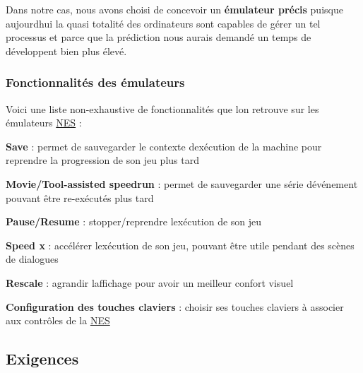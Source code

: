 Dans notre cas, nous avons choisi de concevoir un {\bfseries émulateur précis} puisque aujourd\textquotesingle{}hui la quasi totalité des ordinateurs sont capables de gérer un tel processus et parce que la prédiction nous aurais demandé un temps de développent bien plus élevé.

\subsubsection*{Fonctionnalités des émulateurs}

Voici une liste non-\/exhaustive de fonctionnalités que l\textquotesingle{}on retrouve sur les émulateurs \hyperlink{struct_n_e_s}{N\+ES} \+:


\begin{DoxyItemize}
\item {\bfseries Save} \+: permet de sauvegarder le contexte d\textquotesingle{}exécution de la machine pour reprendre la progression de son jeu plus tard
\item {\bfseries Movie/\+Tool-\/assisted speedrun} \+: permet de sauvegarder une série d\textquotesingle{}événement pouvant être re-\/exécutés plus tard
\item {\bfseries Pause/\+Resume} \+: stopper/reprendre l\textquotesingle{}exécution de son jeu
\item {\bfseries Speed x} \+: accélérer l\textquotesingle{}exécution de son jeu, pouvant être utile pendant des scènes de dialogues
\item {\bfseries Rescale} \+: agrandir l\textquotesingle{}affichage pour avoir un meilleur confort visuel
\item {\bfseries Configuration des touches claviers} \+: choisir ses touches claviers à associer aux contrôles de la \hyperlink{struct_n_e_s}{N\+ES}
\end{DoxyItemize}

\subsection*{Exigences}


